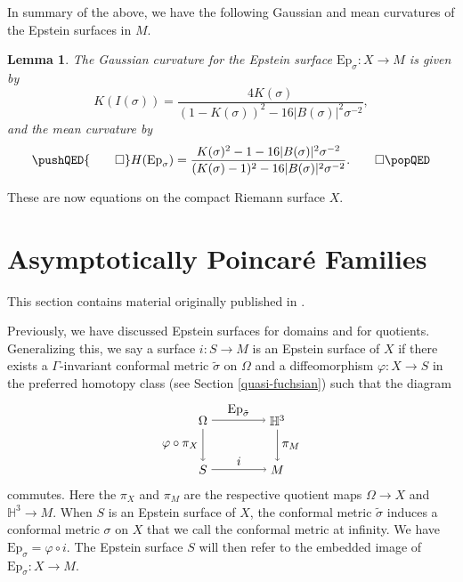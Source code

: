 \documentclass{amsart}
\renewcommand{\H}{\mathbb{H}}
\newtheorem{lem}[thm]{Lemma}
\begin{document}
In summary of the above, we have the following Gaussian and mean curvatures of the Epstein surfaces in $M$.
\begin{lem}
\label{curvature-epstein}
The Gaussian curvature for the Epstein surface $\mathrm{Ep}_\sigma : X \to M$ is given by
\[
K(I(\sigma))
= \frac{4K(\sigma)}{(1-K(\sigma))^2 - 16 |B(\sigma)|^2\sigma^{-2}},
\]
and the mean curvature by 
\[
\pushQED{\qed}
H(\mathrm{Ep}_\sigma)
= \frac{K(\sigma)^2 - 1 - 16 |B(\sigma)|^2\sigma^{-2}}{(K(\sigma) - 1)^2 - 16 |B(\sigma)|^2\sigma^{-2}}.
\qedhere
\popQED
\]
\end{lem}
These are now equations on the compact Riemann surface $X$.






\section{Asymptotically Poincar\'e Families} \label{main-results-chapter}

\begin{center}This section contains material originally published in \cite{quinn2020}.
\end{center}




Previously, we have discussed Epstein surfaces for domains and for quotients. 
Generalizing this, we say a surface $i : S \to M$ is an Epstein surface of $X$ if there exists a $\Gamma$-invariant conformal metric $\tilde{\sigma}$ on $\Omega$ and a diffeomorphism $\varphi : X \to S$ in the preferred homotopy class (see Section \ref{quasi-fuchsian}) such that the diagram 
\[
\begin{tikzpicture}[scale=0.7]
\node (1) at (0,2) {$\Omega$};
\node (2) at (3,2) {$\H^3$};
\node (3) at (0,0) {$S$};
\node (4) at (3,0) {$M$};


\draw[->] (1) to node [above] {$\mathrm{Ep}_{\tilde{\sigma}}$} (2);
\draw[->] (1) to node [left] {$\varphi \circ \pi_X$} (3);
\draw[->] (3) to node [above] {$i$} (4);
\draw[->] (2) to node [right] {$\pi_M$} (4);

\end{tikzpicture}
\]
commutes. 
Here the $\pi_X$ and $\pi_M$ are the respective quotient maps $\Omega \to X$ and $\H^3 \to M$.
When $S$ is an Epstein surface of $X$, the conformal metric $\tilde{\sigma}$ induces a conformal metric $\sigma$ on $X$ that we call the conformal metric at infinity. 
We have $\mathrm{Ep}_{\sigma} = \varphi \circ i$. 
The Epstein surface $S$ will then refer to the embedded image of $\mathrm{Ep}_{\sigma}: X \to M$. 
\end{document}

